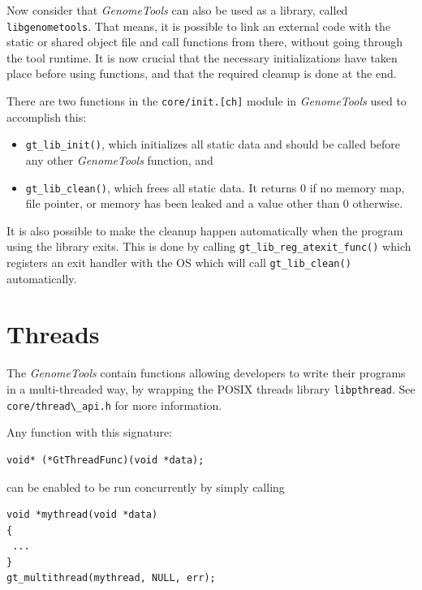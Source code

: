 \documentclass[11pt,final]{article}
\newcommand{\keyword}[1]{\lstinline{#1}}
\newcommand{\Gt}[0]{\emph{GenomeTools}\xspace}
\begin{document}
Now consider that \Gt can also be used as a library, called
\keyword{libgenometools}. That means, it is possible to link an external code
with the static or shared object file and call functions from there, without
going through the tool runtime. It is now crucial that the necessary
initializations have taken place before using functions, and that the required
cleanup is done at the end.

There are two functions in the \keyword{core/init.[ch]} module in \Gt used to
accomplish this:
\begin{itemize}
\item
\keyword{gt_lib_init()}, which initializes all static data and should be called
before any other \Gt function, and
\item
\keyword{gt_lib_clean()}, which frees all static data. It returns 0 if no
memory map, file pointer, or memory has been leaked and a value other than 0
otherwise.
\end{itemize}
It is also possible to make the cleanup happen automatically when the program
using  the library exits. This is done by calling
\keyword{gt_lib_reg_atexit_func()} which registers an exit handler with the OS
which will call \keyword{gt_lib_clean()} automatically.

\section{Threads}
The \Gt contain functions allowing developers to write their programs in a
multi-threaded way, by wrapping the POSIX threads library \keyword{libpthread}.
See \keyword{core/thread\_api.h} for more information.

Any function with this signature:

\begin{lstlisting}
void* (*GtThreadFunc)(void *data);
\end{lstlisting}

can be enabled to be run concurrently by simply calling

\begin{lstlisting}
void *mythread(void *data)
{
 ...
}
gt_multithread(mythread, NULL, err);
\end{lstlisting}
\end{document}

